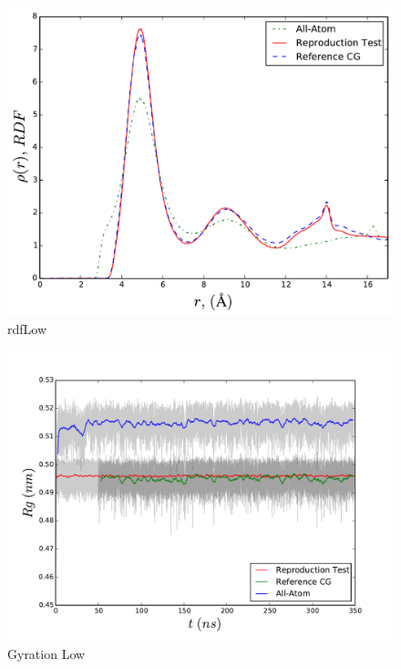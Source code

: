 \documentclass[10pt,a4paper,twoside]{article}
\begin{document}
   \begin{figure}[H]
  \begin{center}
	\includegraphics[width=0.8 \textwidth]{./graphs/rdfL}
	\caption{rdfLow}
	\label{gfx:rdfLow}
	\end{center}
	\end{figure}
	   \begin{figure}[H]
  \begin{center}
		\includegraphics[width=0.8 \textwidth]{./graphs/GyraL}
	\caption{Gyration Low}
	\label{gfx:gyrLow}
	\end{center}
	\end{figure}
\end{document}
